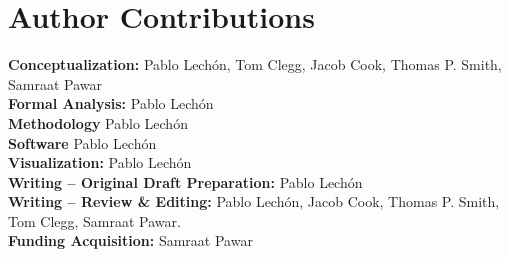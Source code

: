 \documentclass[10pt,letterpaper]{article}
\begin{document}
\section*{Author Contributions}
\textbf{Conceptualization:} Pablo Lechón, Tom Clegg, Jacob Cook, Thomas P. Smith, Samraat Pawar\\[10pt]
\hspace{-14pt}\textbf{Formal Analysis:} Pablo Lechón \\[10pt]
\hspace{-14pt}\textbf{Methodology} Pablo Lechón \\[10pt]
\hspace{-14pt}\textbf{Software} Pablo Lechón \\[10pt]
\hspace{-14pt}\textbf{Visualization:} Pablo Lechón \\[10pt]
\hspace{-14pt}\textbf{Writing – Original Draft Preparation:} Pablo Lechón \\[10pt]
\hspace{-14pt}\textbf{Writing – Review \& Editing:} Pablo Lechón, Jacob Cook, Thomas P. Smith, Tom Clegg, Samraat Pawar. \\[10pt]
\hspace{-14pt}\textbf{Funding Acquisition:} Samraat Pawar \\[10pt]


\nolinenumbers
\end{document}
